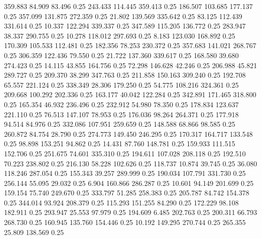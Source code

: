  359.883   84.909   83.496         0.25
 243.433  114.445  359.413         0.25
 186.507  103.685  177.137         0.25
 357.099  131.875  272.359         0.25
  21.802  139.569  335.642         0.25
  83.125  112.439  331.614         0.25
  10.337  122.294  339.337         0.25
 347.589  115.205  136.772         0.25
 283.947   38.337  290.755         0.25
  10.278  118.012  297.693         0.25
   8.183  123.030  168.892         0.25
 170.309  105.533  112.481         0.25
 182.356   78.253  230.372         0.25
 357.683  141.021  268.767         0.25
 306.359  122.436   79.550         0.25
  21.722  137.360  339.617         0.25
 168.580   39.680  274.423         0.25
  14.115   43.855  164.756         0.25
  72.298  146.628   42.246         0.25
 206.988   45.821  289.727         0.25
 209.370   38.299  347.763         0.25
 211.858  150.163  309.240         0.25
 192.708   65.557  221.124         0.25
 338.349   28.306  179.250         0.25
  54.775  108.216  324.361         0.25
 209.668  100.292  202.336         0.25
 163.177   40.042  122.284         0.25
 342.891  171.465  318.800         0.25
 165.354   46.932  236.496         0.25
 232.912   54.980   78.350         0.25
 178.834  123.637  221.110         0.25
  76.513  147.107   78.953         0.25
 176.036   98.264  264.371         0.25
 177.918   94.514   84.976         0.25
 332.086  107.951  259.659         0.25
 148.588   68.866   98.585         0.25
 260.872   84.754   28.790         0.25
 274.773  149.450  246.295         0.25
 170.317  164.717  133.548         0.25
  98.898  153.251   94.862         0.25
  14.431   87.760  148.781         0.25
 159.933  111.515  152.706         0.25
 251.675   74.601  335.310         0.25
 194.611  107.028  208.118         0.25
 192.510   70.223  238.802         0.25
 216.130   58.228  102.626         0.25
 118.737   10.874   39.745         0.25
  36.080  118.246  287.054         0.25
 155.343   39.257  289.999         0.25
 190.034  107.791  331.730         0.25
 256.144   55.095   29.032         0.25
   6.904  160.866  286.287         0.25
  10.601   94.149  201.699         0.25
 159.154   75.740  249.670         0.25
 333.797   51.285  258.383         0.25
 205.787   84.742  154.378         0.25
 344.014   93.924  208.379         0.25
 115.293  151.255   84.290         0.25
 172.229   98.108  182.911         0.25
 293.947   25.553   97.979         0.25
 194.609    6.485  202.763         0.25
 200.311   66.793  268.730         0.25
 160.945  135.760  154.446         0.25
  10.192  149.295  270.744         0.25
 265.355   25.809  138.569         0.25
